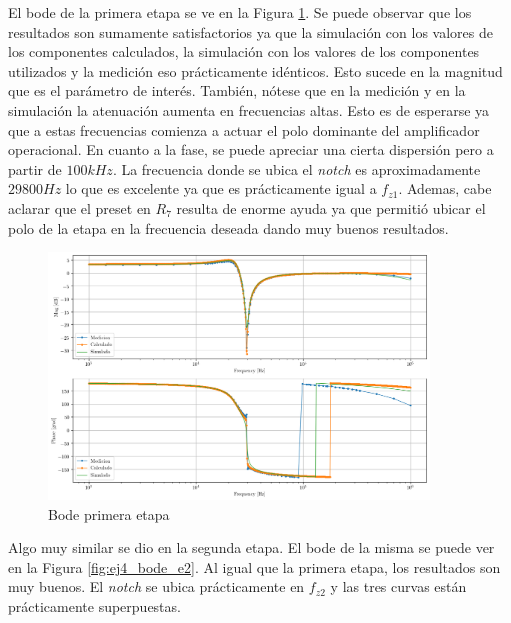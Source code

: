 El bode de la primera etapa se ve en la Figura \ref{fig:ej4_bode_e1}. Se puede observar que los resultados son sumamente satisfactorios ya que la simulación con los valores de los componentes calculados, la simulación con los valores de los componentes utilizados y la medición eso prácticamente idénticos. Esto sucede en la magnitud que es el parámetro de interés. También, nótese que en la medición y en la simulación la atenuación aumenta en frecuencias altas. Esto es de esperarse ya que a estas frecuencias comienza a actuar el polo dominante del amplificador operacional. En cuanto a la fase, se puede apreciar una cierta dispersión pero a partir de $100kHz$. La frecuencia donde se ubica el \textit{notch} es aproximadamente $29800 Hz$ lo que es excelente ya que es prácticamente igual a $f_{z1}$. Ademas, cabe aclarar que el preset en $R_7$ resulta de enorme ayuda ya que permitió ubicar el polo de la etapa en la frecuencia deseada dando muy buenos resultados. 

\begin{figure}[h!]                                                
    \centering\includegraphics[width=0.9\textwidth]{../Ex4/Resources/ej4_bode_e1.png}
    \caption{Bode primera etapa}
    \label{fig:ej4_bode_e1}
    \end{figure}

Algo muy similar se dio en la segunda etapa. El bode de la misma se puede ver en la Figura \ref{fig:ej4_bode_e2}. Al igual que la primera etapa, los resultados son muy buenos. El \textit{notch} se ubica prácticamente en $f_{z2}$ y las tres curvas están prácticamente superpuestas.  

